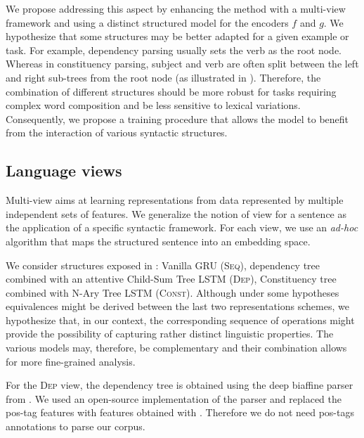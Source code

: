 We propose addressing this aspect by enhancing the method with a multi-view framework and using a distinct structured model for the encoders $f$ and $g$. We hypothesize that some structures may be better adapted for a given example or task. 
For example, dependency parsing usually sets the verb as the root node. Whereas in constituency parsing, subject and verb are often split between the left and right sub-trees from the root node (as illustrated in ). Therefore, the combination of different structures should be more robust for tasks requiring complex word composition and be less sensitive to lexical variations. Consequently, we propose a training procedure that allows the model to benefit from the interaction of various syntactic structures.
\subsection{Language views}

Multi-view aims at learning representations from data represented by multiple independent sets of features. We generalize the notion of view for a sentence as the application of a specific syntactic framework. For each view, we use an \textit{ad-hoc} algorithm that maps the structured sentence into an embedding space.

We consider structures exposed in : Vanilla GRU (\textsc{Seq}), dependency tree combined with an attentive Child-Sum Tree LSTM (\textsc{Dep}), Constituency tree combined with N-Ary Tree LSTM (\textsc{Const}). Although under some hypotheses equivalences might be derived between the last two representations schemes, we hypothesize that, in our context, the corresponding sequence of operations might provide the possibility of capturing rather distinct linguistic properties. The various models may, therefore, be complementary and their combination allows for more fine-grained analysis. 

For the \textsc{Dep} view, the dependency tree is obtained using the deep biaffine parser from \textcite{dozat_17}. We used an open-source implementation of the parser and replaced the pos-tag features with features obtained with \bert. Therefore we do not need pos-tags annotations to parse our corpus. 

